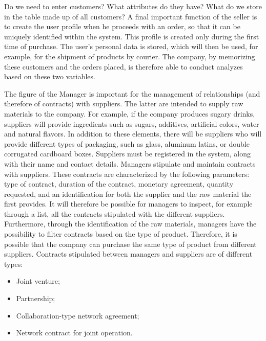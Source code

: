 Do we need to enter customers? What attributes do they have? What do we store in the table made up of all customers?
A final important function of the seller is to create the user profile when he proceeds with an order, so that it can be uniquely identified within the system. This profile is created only during the first time of purchase. The user's personal data is stored, which will then be used, for example, for the shipment of products by courier. The company, by memorizing these customers and the orders placed, is therefore able to conduct analyzes based on these two variables.

The figure of the Manager is important for the management of relationships (and therefore of contracts) with suppliers. The latter are intended to supply raw materials to the company. For example, if the company produces sugary drinks, suppliers will provide ingredients such as sugars, additives, artificial colors, water and natural flavors. In addition to these elements, there will be suppliers who will provide different types of packaging, such as glass, aluminum latins, or double corrugated cardboard boxes. Suppliers must be registered in the system, along with their name and contact details. Managers stipulate and maintain contracts with suppliers. These contracts are characterized by the following parameters: type of contract, duration of the contract, monetary agreement, quantity requested, and an identification for both the supplier and the raw material the first provides. It will therefore be possible for managers to inspect, for example through a list, all the contracts stipulated with the different suppliers. Furthermore, through the identification of the raw materials, managers have the possibility to filter contracts based on the type of product. Therefore, it is possible that the company can purchase the same type of product from different suppliers. Contracts stipulated between managers and suppliers are of different types:
\begin{itemize}
    \item Joint venture;
    \item Partnership;
    \item Collaboration-type network agreement;
    \item Network contract for joint operation.
\end{itemize}
